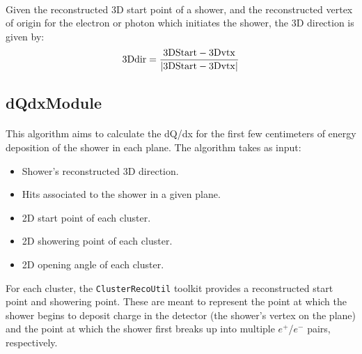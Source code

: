 \paragraph{}Given the reconstructed 3D start point of a shower, and the reconstructed vertex of origin for the electron or photon which initiates the shower, the 3D direction is given by:
\begin{equation}
{\rm 3Ddir} = \frac{ {\rm 3DStart} - {\rm 3Dvtx} }{ |{\rm 3DStart} - {\rm 3Dvtx}| }
\end{equation}

\subsection{dQdxModule}
\paragraph{}This algorithm aims to calculate the dQ/dx for the first few centimeters of energy deposition of the shower in each plane. The algorithm takes as input:
\begin{itemize}
\item Shower's reconstructed 3D direction.
\item Hits associated to the shower in a given plane.
\item 2D start point of each cluster.
\item 2D showering point of each cluster.
\item 2D opening angle of each cluster.
\end{itemize}
For each cluster, the \texttt{ClusterRecoUtil} toolkit provides a reconstructed start point and showering point. These are meant to represent the point at which the shower begins to deposit charge in the detector (the shower's vertex on the plane) and the point at which the shower first breaks up into multiple $e^+$/$e^-$ pairs, respectively.
